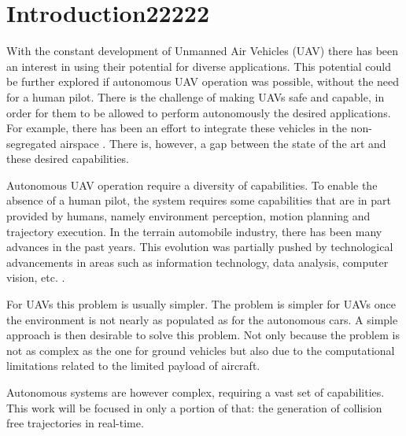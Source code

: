 \section{Introduction22222}
With the constant development of Unmanned Air Vehicles (UAV) there has been an interest in using their potential for diverse applications. This potential could be further explored if autonomous UAV operation was possible, without the need for a human pilot. There is the challenge of making UAVs safe and capable, in order for them to be allowed to perform autonomously the desired applications. For example, there has been an effort to integrate these vehicles in the non-segregated airspace \cite{ref:history}. There is, however, a gap between the state of the art and these desired capabilities. 
\par
Autonomous UAV operation require a diversity of capabilities. To enable the absence of a human pilot, the system requires some capabilities that are in part provided by humans, namely environment perception, motion planning and trajectory execution. In the terrain automobile industry, there has been many advances in the past years. This evolution was partially pushed by technological advancements in areas such as information technology, data analysis, computer vision, etc.  \cite{ref:autonumousCars}.
\par
For UAVs this problem is usually simpler.  The problem is simpler for UAVs once the environment is not nearly as populated as for the autonomous cars. A simple approach is then desirable to solve this problem. Not only because the problem is not as complex as the one for ground vehicles but also due to the computational limitations related to the limited payload of aircraft. 
\par 
Autonomous systems are however complex, requiring a vast set of capabilities. This work will be focused in only a portion of that: the generation of collision free trajectories in real-time.
